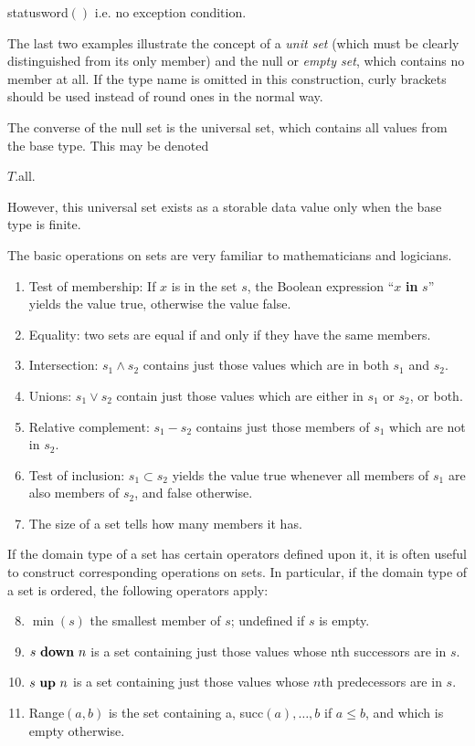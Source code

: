 \quad statusword$()$ \tabto*{14em} i.e. no exception condition.

\noindent
The last two examples illustrate the concept of a \textit{unit set} (which must be clearly distinguished from its only member) and the null or \textit{empty set}, which contains no member at all. If the type name is omitted in this construction, curly brackets should be used instead of round ones in the normal way.

The converse of the null set is the universal set, which contains all values from the base type. This may be denoted

\quad $T$.all.

\noindent
However, this universal set exists as a storable data value only when the base type is finite.

The basic operations on sets are very familiar to mathematicians and logicians.

\begin{enumerate}[leftmargin=2\parindent, label=(\arabic*)]
	\item Test of membership: If $x$ is in the set $s$, the Boolean expression ``$x$ \textbf{in} $s$'' yields the value true, otherwise the value false.
	\item Equality: two sets are equal if and only if they have the same members.
	\item Intersection: $s_1 \wedge s_2$ contains just those values which are in both $s_1$ and $s_2$.
	\item Unions: $s_1 \vee s_2$ contain just those values which are either in $s_1$ or $s_2$, or both.
	\item Relative complement: $s_1 - s_2$ contains just those members of $s_1$ which are not in $s_2$.
	\item Test of inclusion: $s_1 \subset s_2$ yields the value true whenever all members of $s_1$ are also members of $s_2$, and false otherwise.
	\item The size of a set tells how many members it has.
\end{enumerate}

If the domain type of a set has certain operators defined upon it, it is often useful to construct corresponding operations on sets. In particular, if the domain type of a set is ordered, the following operators apply:

\begin{enumerate}[leftmargin=2\parindent, label=(\arabic*)]
	\setcounter{enumi}{7}
	
	\item $\min(s)$ the smallest member of $s$; undefined if $s$ is empty.
	\item $s \text{ \textbf{down} } n$ is a set containing just those values whose nth successors are in $s$.
	\item $s \text{ \textbf{up} } n$ is a set containing just those values whose $n$th predecessors are in $s$.
	\item Range$(a, b)$ is the set containing a, succ$(a), \dots, b$ if $a \leqslant b$, and which is empty otherwise.
\end{enumerate}

